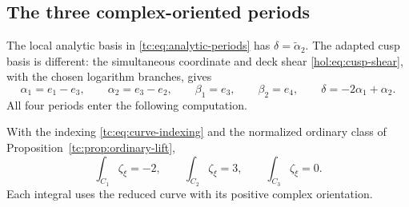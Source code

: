 \subsection{The three complex-oriented periods}

The local analytic basis in \eqref{tc:eq:analytic-periods}
has $\delta=\widetilde\alpha_2$.
The adapted cusp basis is different: the simultaneous
coordinate and deck shear \eqref{hol:eq:cusp-shear}, with the
chosen logarithm branches, gives
\begin{equation}\label{tc:eq:adapted-period-basis}
 \alpha_1=e_1-e_3,\qquad \alpha_2=e_3-e_2,\qquad
 \beta_1=e_3,\qquad \beta_2=e_4,
 \qquad \delta=-2\alpha_1+\alpha_2.
\end{equation}
All four periods enter the following computation.

\begin{theorem}\label{tc:thm:actual-periods}
With the indexing \eqref{tc:eq:curve-indexing} and the
normalized ordinary class of Proposition~\ref{tc:prop:ordinary-lift},
\begin{equation}\label{tc:eq:actual-periods}
 \int_{C_1}\zeta_\xi=-2,\qquad
 \int_{C_2}\zeta_\xi=3,\qquad
 \int_{C_3}\zeta_\xi=0.
\end{equation}
Each integral uses the reduced curve with its positive
complex orientation.
\end{theorem}

